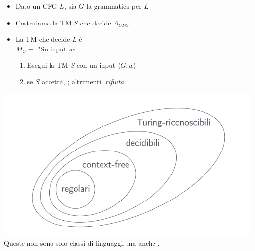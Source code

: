 \begin{itemize}
	\item Dato un CFG $L$, sia $G$ la grammatica per $L$ 
	\item Costruiamo la TM $S$ che decide $A_{CFG}$ 
	\item La TM che decide $L$ è \\
  	$M_G=$ "Su input $w$: 
		\begin{enumerate}
	  	\item Esegui la TM $S$ con un input $\langle G, w\rangle$ 
	  	\item se $S$ accetta, ; altrimenti, \textit{rifiuta}
		\end{enumerate}
\end{itemize}


\includegraphics[scale=0.5]{img/rel_classi_linguaggi.png}
Queste non sono solo classi di linguaggi, ma anche . 
